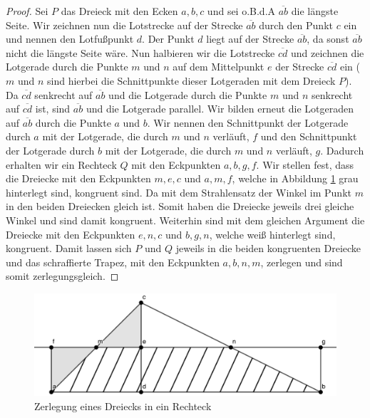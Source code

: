 \documentclass[11pt,titlepage]{article}
\theoremstyle{definition}
\theoremstyle{remark}
\begin{document}
	\begin{proof}
		Sei $P$ das Dreieck mit den Ecken $a,b,c$ und sei o.B.d.A $\overline{ab}$ die längste Seite. Wir zeichnen 
		nun die Lotstrecke auf der Strecke $\overline{ab}$ durch den Punkt $c$ ein und nennen den Lotfußpunkt $d$. 
		Der Punkt $d$ liegt auf der Strecke $\overline{ab}$, da sonst $\overline{ab}$ nicht die längste Seite wäre. 
		Nun halbieren wir die Lotstrecke $\overline{cd}$ und zeichnen die Lotgerade durch die Punkte $m$ und $n$ 
		auf dem Mittelpunkt $e$ der Strecke $\overline{cd}$ ein ($m$ und $n$ sind hierbei die Schnittpunkte 
		dieser Lotgeraden mit dem Dreieck $P$). Da $\overline{cd}$ senkrecht auf $\overline{ab}$ und die Lotgerade 
		durch die Punkte $m$ und $n$ 
		senkrecht auf $\overline{cd}$ ist, sind $\overline{ab}$ und die Lotgerade parallel. Wir bilden erneut die 
		Lotgeraden auf $\overline{ab}$ durch die Punkte $a$ und $b$. Wir nennen den Schnittpunkt der Lotgerade 
		durch $a$ mit der Lotgerade, die durch $m$ und $n$ verläuft, $f$ und den Schnittpunkt der Lotgerade durch 
		$b$ mit der Lotgerade, die durch $m$ und $n$ verläuft, $g$. Dadurch erhalten wir ein Rechteck $Q$ mit den 
		Eckpunkten $a,b,g,f$. Wir stellen fest, dass die Dreiecke mit den Eckpunkten $m,e,c$ und $a,m,f$, welche in 
		Abbildung \ref{Abb.1} grau hinterlegt sind, kongruent sind. Da mit dem Strahlensatz der Winkel im 
		Punkt $m$ in den beiden Dreiecken gleich ist. Somit haben die 
		Dreiecke jeweils drei gleiche Winkel und sind damit kongruent. 
		Weiterhin sind mit dem gleichen Argument die Dreiecke mit den Eckpunkten $e,n,c$ und $b,g,n$, welche weiß 
		hinterlegt sind, kongruent. Damit lassen sich $P$ und $Q$ jeweils 
		in die beiden 
		kongruenten Dreiecke und das schraffierte Trapez, mit den Eckpunkten $a,b,n,m$, zerlegen und sind somit 
		zerlegungsgleich.
	\end{proof}
	
	\begin{figure}[!htbp]
		\centering
		\includegraphics[scale=1.6]{DreieckLemma}
		\caption{Zerlegung eines Dreiecks in ein Rechteck}
		\label{Abb.1}
	\end{figure}
	
\end{document}
